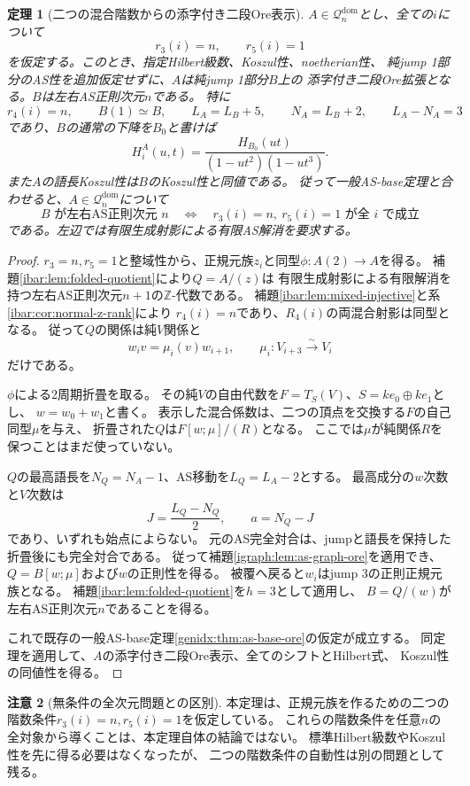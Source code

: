 \documentclass[11pt,a4paper]{ltjsarticle}
\newtheorem{theorem}{定理}[section]
\theoremstyle{definition}
\newtheorem{remark}[theorem]{注意}
\begin{document}
\begin{theorem}[二つの混合階数からの添字付き二段Ore表示]
\label{igraph:thm:normal-z-ore}
$A\in\mathcal Q_n^{\mathrm{dom}}$とし、全ての$i$について
\[
r_3(i)=n,\qquad r_5(i)=1
\]
を仮定する。このとき、指定Hilbert級数、Koszul性、noetherian性、
純jump 1部分のAS性を追加仮定せずに、$A$は純jump 1部分$B$上の
添字付き二段Ore拡張となる。$B$は左右AS正則次元$n$である。
特に
\[
r_4(i)=n,\qquad B(1)\simeq B,\qquad
L_A=L_B+5,\qquad N_A=L_B+2,\qquad L_A-N_A=3
\]
であり、$B$の通常の下降を$B_0$と書けば
\[
H_i^A(u,t)=\frac{H_{B_0}(ut)}{(1-ut^2)(1-ut^3)}.
\]
また$A$の語長Koszul性は$B$のKoszul性と同値である。
従って一般AS-base定理と合わせると、$A\in\mathcal Q_n^{\mathrm{dom}}$について
\[
B\text{ が左右AS正則次元 }n
\quad\Longleftrightarrow\quad
r_3(i)=n,\ r_5(i)=1\text{ が全 }i\text{ で成立}
\]
である。左辺では有限生成射影による有限AS解消を要求する。
\end{theorem}
\begin{proof}
$r_3=n,r_5=1$と整域性から、正規元族$z_i$と同型$\phi:A(2)\to A$を得る。
補題\ref{ibar:lem:folded-quotient}により$Q=A/(z)$は
有限生成射影による有限解消を持つ左右AS正則次元$n+1$の$\mathbb Z$-代数である。
補題\ref{ibar:lem:mixed-injective}と系\ref{ibar:cor:normal-z-rank}により
$r_4(i)=n$であり、$R_4(i)$の両混合射影は同型となる。
従って$Q$の関係は純$V$関係と
\[
w_i v=\mu_i(v)w_{i+1},\qquad \mu_i:V_{i+3}\xrightarrow{\sim}V_i
\]
だけである。

$\phi$による2周期折畳を取る。
その純$V$の自由代数を$F=T_S(V)$、$S=ke_0\oplus ke_1$とし、
$w=w_0+w_1$と書く。
表示した混合係数は、二つの頂点を交換する$F$の自己同型$\mu$を与え、
折畳された$Q$は$F[w;\mu]/(R)$となる。
ここでは$\mu$が純関係$R$を保つことはまだ使っていない。

$Q$の最高語長を$N_Q=N_A-1$、AS移動を$L_Q=L_A-2$とする。
最高成分の$w$次数と$V$次数は
\[
J=\frac{L_Q-N_Q}{2},\qquad a=N_Q-J
\]
であり、いずれも始点によらない。
元のAS完全対合は、jumpと語長を保持した折畳後にも完全対合である。
従って補題\ref{igraph:lem:as-graph-ore}を適用でき、
$Q=B[w;\mu]$および$w$の正則性を得る。
被覆へ戻ると$w_i$はjump 3の正則正規元族となる。
補題\ref{ibar:lem:folded-quotient}を$h=3$として適用し、
$B=Q/(w)$が左右AS正則次元$n$であることを得る。

これで既存の一般AS-base定理\ref{genidx:thm:as-base-ore}の仮定が成立する。
同定理を適用して、$A$の添字付き二段Ore表示、全てのシフトとHilbert式、
Koszul性の同値性を得る。
\end{proof}

\begin{remark}[無条件の全次元問題との区別]
本定理は、正規元族を作るための二つの階数条件$r_3(i)=n,r_5(i)=1$を仮定している。
これらの階数条件を任意$n$の全対象から導くことは、本定理自体の結論ではない。
標準Hilbert級数やKoszul性を先に得る必要はなくなったが、
二つの階数条件の自動性は別の問題として残る。
\end{remark}
\end{document}
